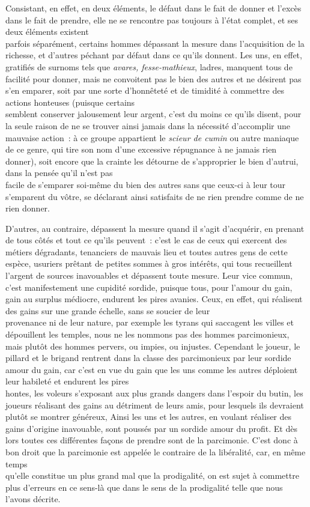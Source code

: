\documentclass[french,twoside]{book} %
\begin{document}
Consistant, en effet, en deux éléments, le défaut dans le fait de donner et l’excès dans le fait de prendre, elle ne se rencontre pas toujours à l’état complet, et ses deux éléments existent \\
parfois séparément, certains hommes dépassant la mesure dans l’acquisition de la richesse, et d’autres péchant par défaut dans ce qu’ils donnent. Les uns, en effet, gratifiés de surnoms tels que {\itshape avares, fesse-mathieux}, ladres, manquent tous de facilité pour donner, mais ne convoitent pas le bien des autres et ne désirent pas s’en emparer, soit par une sorte d’honnêteté et de timidité à commettre des actions honteuses (puisque certains \\
semblent conserver jalousement leur argent, c’est du moins ce qu’ils disent, pour la seule raison de ne se trouver ainsi jamais dans la nécessité d’accomplir une mauvaise action : à ce groupe appartient le {\itshape scieur de cumin} ou autre maniaque de ce genre, qui tire son nom d’une excessive répugnance à ne jamais rien donner), soit encore que la crainte les détourne de s’approprier le bien d’autrui, dans la pensée qu’il n’est pas \\
facile de s’emparer soi-même du bien des autres sans que ceux-ci à leur tour s’emparent du vôtre, se déclarant ainsi satisfaits de ne rien prendre comme de ne rien donner.\par
D’autres, au contraire, dépassent la mesure quand il s’agit d’acquérir, en prenant de tous côtés et tout ce qu’ils peuvent : c’est le cas de ceux qui exercent des métiers dégradants, tenanciers de mauvais lieu et toutes autres gens de cette espèce, usuriers prêtant de petites sommes à gros intérêts, qui tous  recueillent l’argent de sources inavouables et dépassent toute mesure. Leur vice commun, c’est manifestement une cupidité sordide, puisque tous, pour l’amour du gain, gain au surplus médiocre, endurent les pires avanies. Ceux, en effet, qui réalisent des gains sur une grande échelle, sans se soucier de leur \\
provenance ni de leur nature, par exemple les tyrans qui saccagent les villes et dépouillent les temples, nous ne les nommons pas des hommes parcimonieux, mais plutôt des hommes pervers, ou impies, ou injustes. Cependant le joueur, le pillard et le brigand rentrent dans la classe des parcimonieux par leur sordide amour du gain, car c’est en vue du gain que les uns comme les autres déploient leur habileté et endurent les pires \\
hontes, les voleurs s’exposant aux plus grands dangers dans l’espoir du butin, les joueurs réalisant des gains au détriment de leurs amis, pour lesquels ils devraient plutôt se montrer généreux, Ainsi les uns et les autres, en voulant réaliser des gains d’origine inavouable, sont poussés par un sordide amour du profit. Et dès lors toutes ces différentes façons de prendre sont de la parcimonie. C’est donc à bon droit que la parcimonie est appelée le contraire de la libéralité, car, en même temps \\
qu’elle constitue un plus grand mal que la prodigalité, on est sujet à commettre plus d’erreurs en ce sens-là que dans le sens de la prodigalité telle que nous l’avons décrite.
\end{document}
